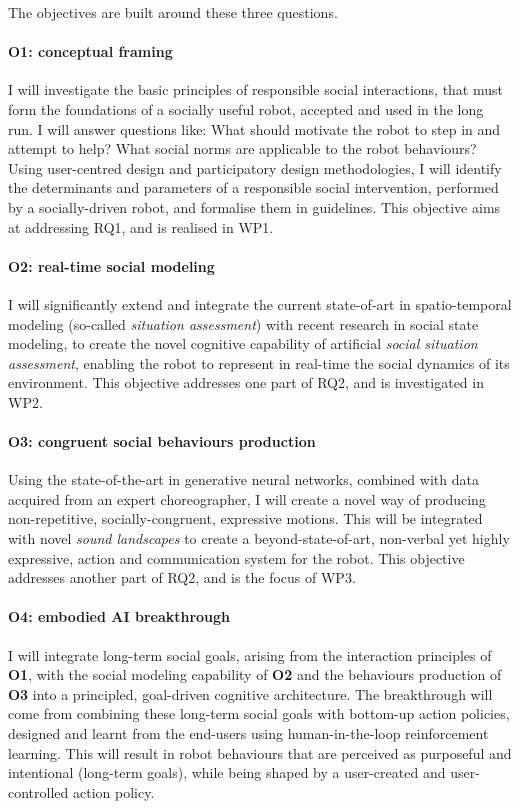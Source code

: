 \vspace{0.5em}
\noindent The \project objectives are built around these three questions.

\paragraph{\bf O1: conceptual framing} I will investigate the basic principles
of responsible social interactions, that must form the foundations of a socially
useful robot, accepted and used in the long run. I will answer questions like:
What should motivate the robot to step in and attempt to help? What social norms
are applicable to the robot behaviours? Using user-centred design and
participatory design methodologies, I will identify the determinants and
parameters of a responsible social intervention, performed by a socially-driven
robot, and formalise them in guidelines. This objective aims at addressing RQ1,
and is realised in WP1.

\paragraph{\bf O2: real-time social modeling} I will significantly extend and integrate
the current state-of-art in spatio-temporal modeling (so-called \emph{situation
assessment}) with recent research in social state modeling, to create the novel
cognitive capability of artificial \emph{social situation assessment}, enabling
the robot to represent in real-time the social dynamics of its environment. This
objective addresses one part of RQ2, and is investigated in WP2.


\paragraph{\bf O3: congruent social behaviours production} Using the
state-of-the-art in generative neural networks, combined with data acquired from
an expert choreographer, I will create a novel way of producing non-repetitive,
socially-congruent, expressive motions. This will be integrated with novel
\emph{sound landscapes} to create a beyond-state-of-art, non-verbal yet highly
expressive,  action and communication system for the robot. This objective
addresses another part of RQ2, and is the focus of WP3.

\paragraph{\bf O4: embodied AI breakthrough} I will integrate long-term social
goals, arising from the interaction principles of \textbf{O1}, with the social
modeling capability of \textbf{O2} and the behaviours production of \textbf{O3}
into a principled, goal-driven cognitive architecture. The breakthrough will
come from combining these long-term social goals with bottom-up action policies,
designed and learnt from the end-users using human-in-the-loop reinforcement learning.
This will result in robot behaviours that are perceived as purposeful and
intentional (long-term goals), while being shaped by a
user-created and user-controlled action policy.

